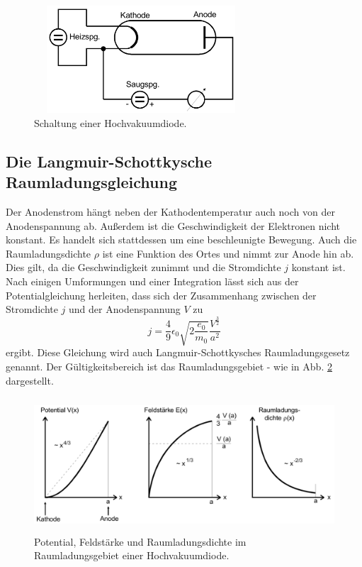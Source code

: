 \begin{figure}
    \centering
    \includegraphics[width=8cm, height=4cm]{build/diode.png}
    \caption{Schaltung einer Hochvakuumdiode. \cite{V504}}
    \label{fig:diode}
\end{figure}

\subsection{Die Langmuir-Schottkysche Raumladungsgleichung}

Der Anodenstrom hängt neben 
der Kathodentemperatur auch noch von der Anodenspannung 
ab. Außerdem ist die Geschwindigkeit der Elektronen nicht 
konstant. Es handelt sich stattdessen um eine beschleunigte 
Bewegung. Auch die Raumladungsdichte $\rho$ ist eine Funktion 
des Ortes und nimmt zur Anode hin ab. Dies gilt, da die 
Geschwindigkeit zunimmt und die Stromdichte $j$ konstant ist. 
Nach einigen Umformungen und einer Integration lässt sich aus 
der Potentialgleichung herleiten, dass sich der Zusammenhang 
zwischen der Stromdichte $j$ und der Anodenspannung $V$ 
zu 
\begin{equation}
    j = \frac{4}{9} \epsilon_0 \sqrt{2 \frac{e_0}{m_0}} \frac{V^{\frac{3}{2}}}{a^2}
    \label{eqn:langmuirschottky}
\end{equation}
ergibt. Diese Gleichung wird auch Langmuir-Schottkysches 
Raumladungsgesetz genannt. Der Gültigkeitsbereich ist das 
Raumladungsgebiet - wie in Abb. \ref{fig:Langmuirschottky}
dargestellt.  

\begin{figure}
    \centering
    \includegraphics[width=13cm, height=5cm]{build/raumladungsgebiet.png}
    \caption{Potential, Feldstärke und Raumladungsdichte im Raumladungsgebiet
        einer Hochvakuumdiode. \cite{V504}}
    \label{fig:Langmuirschottky}
\end{figure}

